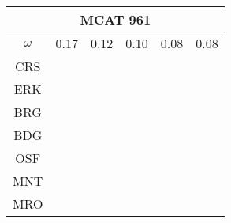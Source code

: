 \documentclass[a4paper,12pt]{article}
\begin{document}
\begin{tabular}{|c|c|c|c|c|c|}%
         \hline \multicolumn{6}{|c|}{MCAT 961} \\ \hline
         $\omega$&0.17&0.12&0.10&0.08&0.08\\ \hline %
        CRS&\cellcolor[HTML]{E41A1C}&\cellcolor[HTML]{E41A1C}&\cellcolor[HTML]{E41A1C}&\cellcolor[HTML]{E41A1C}&\cellcolor[HTML]{E41A1C}\\ \hline %
        ERK&\cellcolor[HTML]{E41A1C}&\cellcolor[HTML]{E41A1C}&\cellcolor[HTML]{E41A1C}&\cellcolor[HTML]{E41A1C}&\cellcolor[HTML]{E41A1C}\\ \hline %
        BRG&\cellcolor[HTML]{377EB8}&\cellcolor[HTML]{377EB8}&\cellcolor[HTML]{377EB8}&\cellcolor[HTML]{377EB8}&\cellcolor[HTML]{377EB8}\\ \hline %
        BDG&\cellcolor[HTML]{377EB8}&\cellcolor[HTML]{377EB8}&\cellcolor[HTML]{377EB8}&\cellcolor[HTML]{377EB8}&\cellcolor[HTML]{377EB8}\\ \hline %
        OSF&\cellcolor[HTML]{4DAF4A}&\cellcolor[HTML]{4DAF4A}&\cellcolor[HTML]{377EB8}&\cellcolor[HTML]{377EB8}&\cellcolor[HTML]{4DAF4A}\\ \hline %
        MNT&\cellcolor[HTML]{4DAF4A}&\cellcolor[HTML]{4DAF4A}&\cellcolor[HTML]{4DAF4A}&\cellcolor[HTML]{4DAF4A}&\cellcolor[HTML]{4DAF4A}\\ \hline %
        MRO&\cellcolor[HTML]{4DAF4A}&\cellcolor[HTML]{4DAF4A}&\cellcolor[HTML]{4DAF4A}&\cellcolor[HTML]{4DAF4A}&\cellcolor[HTML]{4DAF4A}\\ \hline %

\end{tabular}
\end{document}
